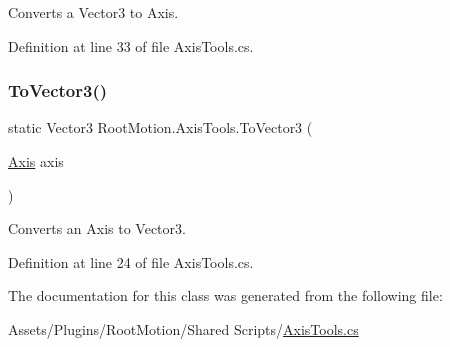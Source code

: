 Converts a Vector3 to Axis. 



Definition at line 33 of file Axis\+Tools.\+cs.

\mbox{\label{class_root_motion_1_1_axis_tools_aea76a99b91ad75567294afd4127bfaca}} 
\subsubsection{\texorpdfstring{To\+Vector3()}{ToVector3()}}
{\footnotesize\ttfamily static Vector3 Root\+Motion.\+Axis\+Tools.\+To\+Vector3 (\begin{DoxyParamCaption}\item[{\mbox{\hyperlink{namespace_root_motion_a824e68ffa644559736d5e0bc80919a87}{Axis}}}]{axis }\end{DoxyParamCaption})\hspace{0.3cm}{\ttfamily [static]}}



Converts an Axis to Vector3. 



Definition at line 24 of file Axis\+Tools.\+cs.



The documentation for this class was generated from the following file\+:\begin{DoxyCompactItemize}
\item 
Assets/\+Plugins/\+Root\+Motion/\+Shared Scripts/\mbox{\hyperlink{_axis_tools_8cs}{Axis\+Tools.\+cs}}\end{DoxyCompactItemize}
